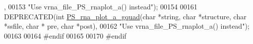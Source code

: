 \begin{DoxyCode}
      ,
00153 \textcolor{stringliteral}{"Use vrna\_file\_PS\_rnaplot\_a() instead"});
00154 
00161 DEPRECATED(\textcolor{keywordtype}{int} \hyperlink{group__plotting__utils_ga32fa0f97625119e9d24dd2e7153abc4f}{PS\_rna\_plot\_a\_gquad}(\textcolor{keywordtype}{char} *\textcolor{keywordtype}{string}, \textcolor{keywordtype}{char} *structure, \textcolor{keywordtype}{char} *ssfile, \textcolor{keywordtype}{char} *
      pre, \textcolor{keywordtype}{char} *post),
00162 \textcolor{stringliteral}{"Use vrna\_file\_PS\_rnaplot\_a() instead"});
00163 
00164 \textcolor{preprocessor}{#endif}
00165 
00170 \textcolor{preprocessor}{#endif}
\end{DoxyCode}
